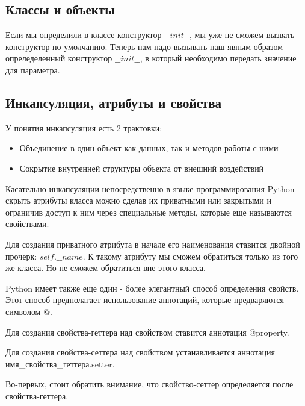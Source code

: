 \documentclass[12pt, a4paper]{article}
\begin{document}
\subsection{Классы и объекты}

Если мы определили в классе конструктор $\_\_init\_\_$, мы уже не сможем вызвать конструктор по умолчанию. Теперь нам надо вызывать наш явным образом опреледеленный конструктор $\_\_init\_\_$, в который необходимо передать значение для параметра.

\subsection{Инкапсуляция, атрибуты и свойства}

У понятия инкапсуляция есть 2 трактовки:

 \begin{itemize}
    \item Объединение в один объект как данных, так и методов работы с ними
    \item Сокрытие внутренней структуры объекта от внешний воздействий
 \end{itemize}

Касательно инкапсуляции непосредственно в языке программирования Python скрыть атрибуты класса можно сделав их приватными или закрытыми и ограничив доступ к ним через специальные методы, которые еще называются свойствами.

\vspace{1em}

Для создания приватного атрибута в начале его наименования ставится двойной прочерк: $self.\_\_name$. К такому атрибуту мы сможем обратиться только из того же класса. Но не сможем обратиться вне этого класса.

\vspace{1em}

Python имеет также еще один - более элегантный способ определения свойств. Этот способ предполагает использование аннотаций, которые предваряются символом @.

Для создания свойства-геттера над свойством ставится аннотация @property.

Для создания свойства-сеттера над свойством устанавливается аннотация имя\_свойства\_геттера.setter.

\vspace{1em}

Во-первых, стоит обратить внимание, что свойство-сеттер определяется после свойства-геттера.
\end{document}
